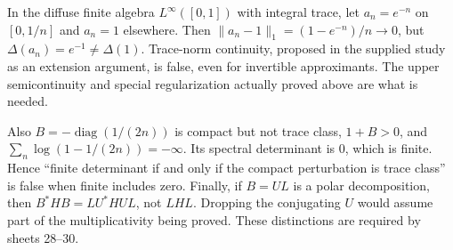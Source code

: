 \begin{example}
\label{geo-H-continuity}
In the diffuse finite algebra $L^\infty([0,1])$ with integral trace, let
$a_n=e^{-n}$ on $[0,1/n]$ and $a_n=1$ elsewhere. Then
$\|a_n-1\|_1=(1-e^{-n})/n\to0$, but
$\Delta(a_n)=e^{-1}\ne\Delta(1)$. Trace-norm continuity, proposed in the
supplied study as an extension argument, is false, even for invertible
approximants. The upper semicontinuity and special regularization actually
proved above are what is needed.

Also $B=-\operatorname{diag}(1/(2n))$ is compact but not trace class,
$1+B>0$, and $\sum_n\log(1-1/(2n))=-\infty$. Its spectral determinant is
$0$, which is finite. Hence ``finite determinant if and only if the compact
perturbation is trace class'' is false when finite includes zero. Finally,
if $B=UL$ is a polar decomposition, then
$B^*HB=L U^*HU L$, not $LHL$. Dropping the conjugating $U$ would assume
part of the multiplicativity being proved. These distinctions are required
by sheets 28--30.
\end{example}

